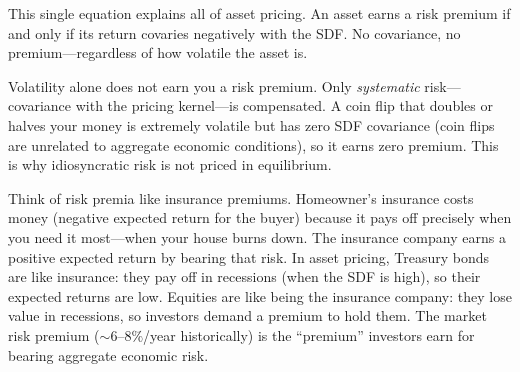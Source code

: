 This single equation explains all of asset pricing. An asset earns a risk premium if and only if its return covaries negatively with the SDF. No covariance, no premium---regardless of how volatile the asset is.

\begin{keyidea}
Volatility alone does not earn you a risk premium. Only \emph{systematic} risk---covariance with the pricing kernel---is compensated. A coin flip that doubles or halves your money is extremely volatile but has zero SDF covariance (coin flips are unrelated to aggregate economic conditions), so it earns zero premium. This is why idiosyncratic risk is not priced in equilibrium.
\end{keyidea}

\begin{intuition}
Think of risk premia like insurance premiums. Homeowner's insurance costs money (negative expected return for the buyer) because it pays off precisely when you need it most---when your house burns down. The insurance company earns a positive expected return by bearing that risk. In asset pricing, Treasury bonds are like insurance: they pay off in recessions (when the SDF is high), so their expected returns are low. Equities are like being the insurance company: they lose value in recessions, so investors demand a premium to hold them. The market risk premium (${\sim}6$--$8\%$/year historically) is the ``premium'' investors earn for bearing aggregate economic risk.
\end{intuition}

